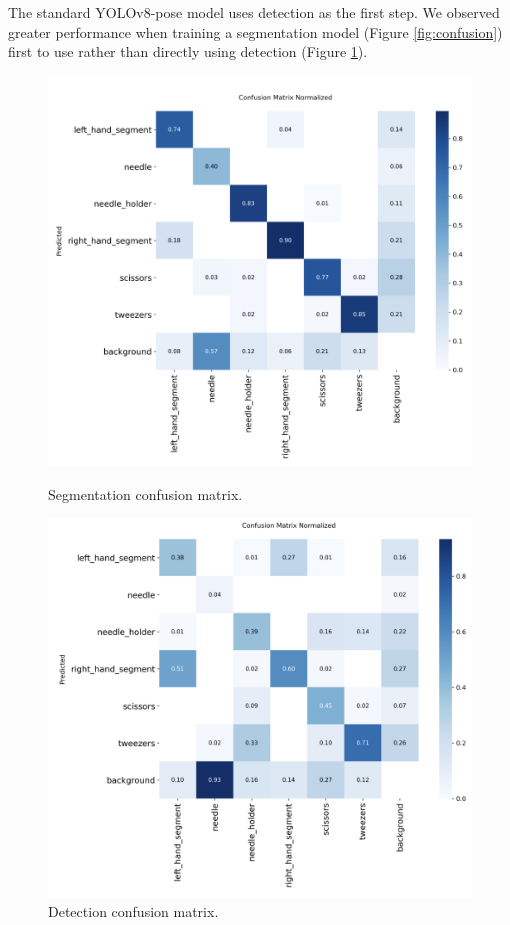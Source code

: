 \documentclass[11pt]{article}
\begin{document}
The standard YOLOv8-pose model uses detection as the first step. We observed greater performance when training a segmentation model (Figure \ref{fig:confusion}) first to use rather than directly using detection (Figure \ref{fig:detection_confusion}).

\begin{figure}[tb]
    \centering
    \begin{minipage}{0.49\linewidth}
        \centering
        \includegraphics[width=\linewidth]{confusion.png}
        \caption{Segmentation confusion matrix.}
        \label{fig:confusion}
    \end{minipage}
    \hfill
    \begin{minipage}{0.49\linewidth}
        \centering
        \includegraphics[width=\linewidth]{detection_confusion.png}
        \caption{Detection confusion matrix.}
        \label{fig:detection_confusion}
    \end{minipage}
\end{figure}
\end{document}
